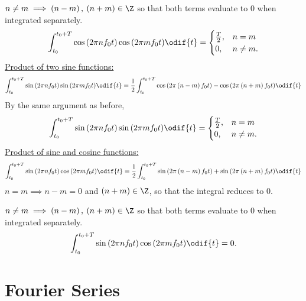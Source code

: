 \documentclass{article}
\begin{document}
\(n \neq m \implies \left( n - m \right),\: \left( n + m \right) \in \Z\) so that both terms evaluate to \(0\) when integrated separately.
\begin{equation*}
    \int_{t_0}^{t_0 + T} \cos{\left( 2\pi n f_0 t \right)} \cos{\left( 2\pi m f_0 t \right)} \odif{t} =
    \begin{cases}
        \frac{T}{2}, & n = m     \\
        0,           & n \neq m.
    \end{cases}
\end{equation*}
\underline{Product of two sine functions:}
\begin{equation*}
    \int_{t_0}^{t_0 + T} \sin{\left( 2\pi n f_0 t \right)} \sin{\left( 2\pi m f_0 t \right)} \odif{t} = \frac{1}{2} \int_{t_0}^{t_0 + T} \cos{\left( 2 \pi \left( n - m \right) f_0 t \right)} - \cos{\left( 2 \pi \left( n + m \right) f_0 t \right)} \odif{t}
\end{equation*}
By the same argument as before,
\begin{equation*}
    \int_{t_0}^{t_0 + T} \sin{\left( 2\pi n f_0 t \right)} \sin{\left( 2\pi m f_0 t \right)} \odif{t} =
    \begin{cases}
        \frac{T}{2}, & n = m     \\
        0,           & n \neq m.
    \end{cases}
\end{equation*}
\underline{Product of sine and cosine functions:}
\begin{equation*}
    \int_{t_0}^{t_0 + T} \sin{\left( 2\pi n f_0 t \right)} \cos{\left( 2\pi m f_0 t \right)} \odif{t} = \frac{1}{2} \int_{t_0}^{t_0 + T} \sin{\left( 2 \pi \left( n - m \right) f_0 t \right)} + \sin{\left( 2 \pi \left( n + m \right) f_0 t \right)} \odif{t}
\end{equation*}
\(n = m \implies n - m = 0\) and \(\left( n + m \right) \in \Z\), so that the integral reduces to \(0\).

\(n \neq m \implies \left( n - m \right),\: \left( n + m \right) \in \Z\) so that both terms evaluate to \(0\) when integrated separately.
\begin{equation*}
    \int_{t_0}^{t_0 + T} \sin{\left( 2\pi n f_0 t \right)} \cos{\left( 2\pi m f_0 t \right)} \odif{t} = 0.
\end{equation*}
\section{Fourier Series}
\end{document}
